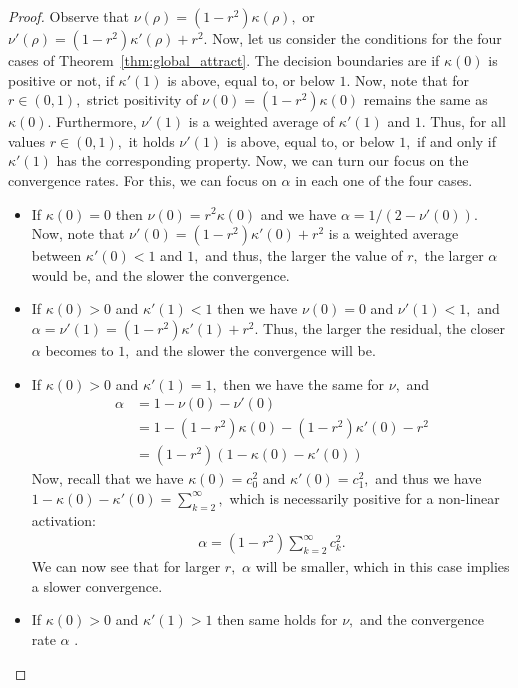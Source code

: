 \documentclass[twoside]{article}
\theoremstyle{definition}
\begin{document}
\begin{proof}
Observe that $\nu(\rho) = (1-r^2) \kappa(\rho),$ or $\nu'(\rho) = (1-r^2) \kappa'(\rho) + r^2.$ Now, let us consider the conditions for the four cases of Theorem~\ref{thm:global_attract}. The decision boundaries are if $\kappa(0)$ is positive or not, if $\kappa'(1)$ is above, equal to, or below $1.$ Now, note that for $r \in (0,1),$ strict positivity of $\nu(0) = (1-r^2) \kappa(0)$ remains the same as $\kappa(0).$ Furthermore, $\nu'(1)$ is a weighted average of $\kappa'(1)$ and $1.$ Thus, for all values $r\in(0,1),$ it holds $\nu'(1)$ is above, equal to, or below $1,$ if and only if $\kappa'(1)$ has the corresponding property.  Now, we can turn our focus on the convergence rates. For this, we can focus on $\alpha$ in each one of the four cases. 
\begin{itemize}
    \item If $\kappa(0)=0$ then $\nu(0) = r^2 \kappa(0)$ and we have $\alpha = 1 / (2-\nu'(0)).$ Now, note that $\nu'(0) = (1-r^2)\kappa'(0) +  r^2$ is a weighted average between $\kappa'(0) < 1$ and $1,$ and thus, the larger the value of $r,$ the larger $\alpha$ would be, and the slower the convergence. 
    \item If $\kappa(0)>0$ and $\kappa'(1)<1$ then we have $\nu(0)=0$ and $\nu'(1) < 1,$ and $\alpha = \nu'(1) = (1-r^2) \kappa'(1) + r^2.$ Thus, the larger the residual, the closer $\alpha$ becomes to $1,$ and the slower the convergence will be.  
    \item If $\kappa(0)>0$ and $\kappa'(1)=1,$ then we have the same for $\nu,$ and 
    \begin{align*}
        \alpha &= 1 - \nu(0) - \nu'(0)\\
        &= 1 - (1-r^2) \kappa(0) - (1-r^2)\kappa'(0) - r^2\\
        &= (1-r^2 )( 1 - \kappa(0) - \kappa'(0))
    \end{align*}
    Now, recall that we have $\kappa(0) = c_0^2$ and $\kappa'(0)=c_1^2,$ and thus we have $1-\kappa(0) - \kappa'(0) = \sum_{k=2}^\infty,$ which is necessarily positive for a non-linear activation:
    \begin{align*}
        \alpha = (1-r^2) \sum_{k=2}^\infty c_k^2.
    \end{align*}
    We can now see that for larger $r,$ $\alpha $ will be smaller, which in this case implies a slower convergence. 
    \item If $\kappa(0)>0$ and $\kappa'(1) > 1$ then same holds for $\nu,$ and the convergence rate $\alpha$ .
\end{itemize}

\end{proof}
\end{document}
